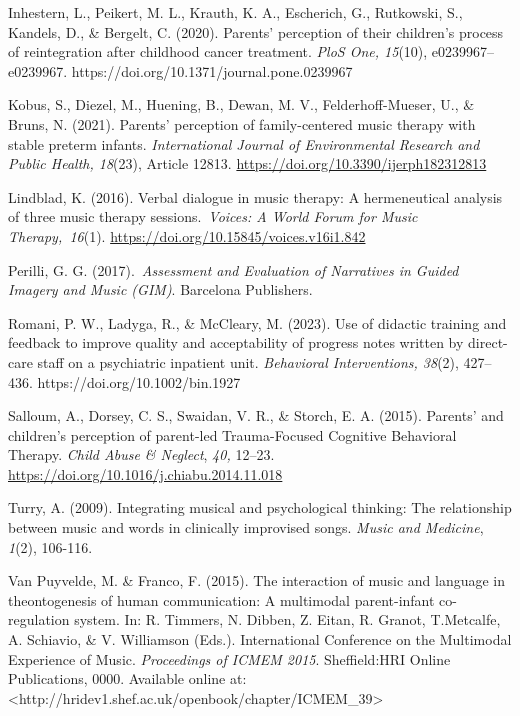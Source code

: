 \documentclass[authordate, empirical]{jote-new-article}
\begin{document}
	Inhestern, L., Peikert, M. L., Krauth, K. A., Escherich, G., Rutkowski, S., Kandels, D., \& Bergelt, C. (2020). Parents' perception of their children's process of reintegration after childhood cancer treatment. \emph{PloS One, 15}(10), e0239967--e0239967. https://doi.org/10.1371/journal.pone.0239967



	 Kobus, S., Diezel, M., Huening, B., Dewan, M. V., Felderhoff-Mueser, U., \& Bruns, N. (2021). Parents' perception of family-centered music therapy with stable preterm infants. \emph{International Journal of Environmental Research and Public Health, 18}(23), Article 12813. \href{https://doi.org/10.3390/ijerph182312813}{https://doi.org/10.3390/ijerph182312813}



	Lindblad, K. (2016). Verbal dialogue in music therapy: A hermeneutical analysis of three music therapy sessions. \emph{Voices: A World Forum for Music Therapy,}\emph{ }\emph{16}(1). \href{https://doi.org/10.15845/voices.v16i1.842}{https://doi.org/10.15845/voices.v16i1.842}



	Perilli, G. G. (2017). \emph{Assessment and Evaluation of Narratives in Guided Imagery and Music (GIM)}. Barcelona Publishers.



	Romani, P. W., Ladyga, R., \& McCleary, M. (2023). Use of didactic training and feedback to improve quality and acceptability of progress notes written by direct-care staff on a psychiatric inpatient unit. \emph{Behavioral Interventions, 38}(2), 427-- 436. https://doi.org/10.1002/bin.1927



	 Salloum, A., Dorsey, C. S., Swaidan, V. R., \& Storch, E. A. (2015). Parents' and children's perception of parent-led Trauma-Focused Cognitive Behavioral Therapy. \emph{Child Abuse \& Neglect}, \emph{40,} 12--23. \href{https://doi.org/10.1016/j.chiabu.2014.11.018}{https://doi.org/10.1016/j.chiabu.2014.11.018}



	Turry, A. (2009). Integrating musical and psychological thinking: The relationship between music and words in clinically improvised songs. \emph{Music and Medicine}, \emph{1}(2), 106-116.



	Van Puyvelde, M. \& Franco, F. (2015). The interaction of music and language in theontogenesis of human communication: A multimodal parent-infant co-regulation system. In: R. Timmers, N. Dibben, Z. Eitan, R. Granot, T.Metcalfe, A. Schiavio, \& V. Williamson (Eds.). International Conference on the Multimodal Experience of Music. \emph{Proceedings of ICMEM 2015}. Sheffield:HRI Online Publications, 0000. Available online at:<http://hridev1.shef.ac.uk/openbook/chapter/ICMEM\_39>
\end{document}
